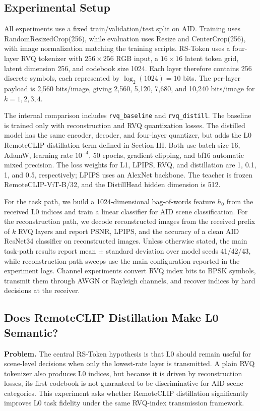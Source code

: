 \documentclass[lettersize,journal]{IEEEtran}
\begin{document}
\subsection{Experimental Setup}
All experiments use a fixed train/validation/test split on AID. Training uses RandomResizedCrop(256), while evaluation uses Resize and CenterCrop(256), with image normalization matching the training scripts. RS-Token uses a four-layer RVQ tokenizer with $256\times256$ RGB input, a $16\times16$ latent token grid, latent dimension 256, and codebook size 1024. Each layer therefore contains 256 discrete symbols, each represented by $\log_2(1024)=10$ bits. The per-layer payload is 2{,}560 bits/image, giving 2{,}560, 5{,}120, 7{,}680, and 10{,}240 bits/image for $k=1,2,3,4$.

The internal comparison includes \texttt{rvq\_baseline} and \texttt{rvq\_distill}. The baseline is trained only with reconstruction and RVQ quantization losses. The distilled model has the same encoder, decoder, and four-layer quantizer, but adds the L0 RemoteCLIP distillation term defined in Section III. Both use batch size 16, AdamW, learning rate $10^{-4}$, 50 epochs, gradient clipping, and bf16 automatic mixed precision. The loss weights for L1, LPIPS, RVQ, and distillation are 1, 0.1, 1, and 0.5, respectively; LPIPS uses an AlexNet backbone. The teacher is frozen RemoteCLIP-ViT-B/32, and the DistillHead hidden dimension is 512.

For the task path, we build a 1024-dimensional bag-of-words feature $h_0$ from the received L0 indices and train a linear classifier for AID scene classification. For the reconstruction path, we decode reconstructed images from the received prefix of $k$ RVQ layers and report PSNR, LPIPS, and the accuracy of a clean AID ResNet34 classifier on reconstructed images. Unless otherwise stated, the main task-path results report mean $\pm$ standard deviation over model seeds 41/42/43, while reconstruction-path sweeps use the main configuration reported in the experiment logs. Channel experiments convert RVQ index bits to BPSK symbols, transmit them through AWGN or Rayleigh channels, and recover indices by hard decisions at the receiver.

\subsection{Does RemoteCLIP Distillation Make L0 Semantic?}
\textbf{Problem.} The central RS-Token hypothesis is that L0 should remain useful for scene-level decisions when only the lowest-rate layer is transmitted. A plain RVQ tokenizer also produces L0 indices, but because it is driven by reconstruction losses, its first codebook is not guaranteed to be discriminative for AID scene categories. This experiment asks whether RemoteCLIP distillation significantly improves L0 task fidelity under the same RVQ-index transmission framework.
\end{document}
